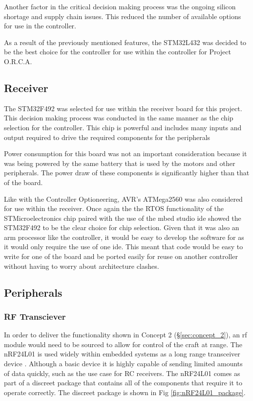 \documentclass [12pt]{article}
\begin{document}
Another factor in the critical decision making process was the ongoing silicon shortage and supply chain issues. This reduced the number of available options for use in the controller.  

As a result of the previously mentioned features, the STM32L432 was decided to be the best choice for the controller for use within the controller for Project O.R.C.A.    

\subsection{Receiver}

The STM32F492 was selected for use within the receiver board for this project. This decision making process was conducted in the same manner as the chip selection for the controller. This chip is powerful and includes many inputs and output required to drive the required components for the peripherals \cite{stmf429zi}

Power consumption for this board was not an important consideration because it was being powered by the same battery that is used by the motors and other peripherals. The power draw of these components is significantly higher than that of the board.

Like with the Controller Optioneering, AVR's ATMega2560 was also considered for use within the receiver. Once again the the RTOS functionality of the STMicroelectronics  chip paired with the use of the \gls{mbed} studio \gls{ide} showed the STM32F492 to be the clear choice for chip selection. Given that it was also an \gls{arm} processor like the controller, it would be easy to develop the software for as it would only require the use of one \gls{ide}. This meant that code would be easy to write for one of the board and be ported easily for reuse on another controller without having to worry about architecture clashes.       

\subsection{Peripherals}
\subsubsection{RF Transciever}

In order to deliver the functionality shown in Concept 2 (§\ref{sec:concept_2}), an \gls{rf} module would need to be sourced to allow for control of the craft at range. The nRF24L01 is used widely within embedded systems as a long range transceiver device \cite{nRF24L01}. Although a basic device it is highly capable of sending limited amounts of data quickly, such as the use case for RC receivers. The nRF24L01 comes as part of a discreet package that contains all of the components that require it to operate correctly. The discreet package is shown in Fig \ref{fig:nRF24L01_package}.
\end{document}
